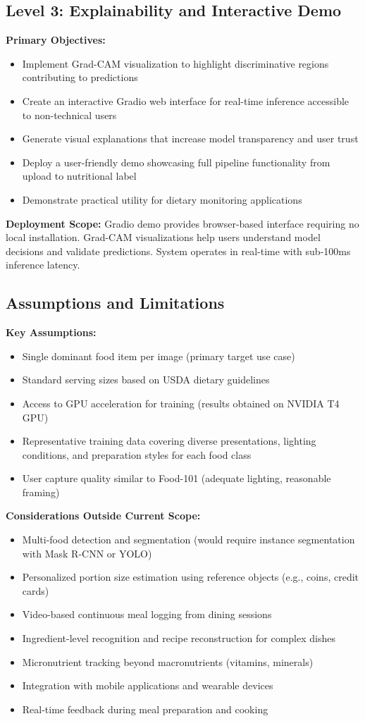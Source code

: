 \documentclass[conference]{IEEEtran}
\begin{document}
\subsection{Level 3: Explainability and Interactive Demo}
\textbf{Primary Objectives:}
\begin{itemize}
    \item Implement Grad-CAM visualization to highlight discriminative regions contributing to predictions
    \item Create an interactive Gradio web interface for real-time inference accessible to non-technical users
    \item Generate visual explanations that increase model transparency and user trust
    \item Deploy a user-friendly demo showcasing full pipeline functionality from upload to nutritional label
    \item Demonstrate practical utility for dietary monitoring applications
\end{itemize}
\textbf{Deployment Scope:} Gradio demo provides browser-based interface requiring no local installation. Grad-CAM visualizations help users understand model decisions and validate predictions. System operates in real-time with sub-100ms inference latency.

\subsection{Assumptions and Limitations}
\textbf{Key Assumptions:}
\begin{itemize}
    \item Single dominant food item per image (primary target use case)
    \item Standard serving sizes based on USDA dietary guidelines
    \item Access to GPU acceleration for training (results obtained on NVIDIA T4 GPU)
    \item Representative training data covering diverse presentations, lighting conditions, and preparation styles for each food class
    \item User capture quality similar to Food-101 (adequate lighting, reasonable framing)
\end{itemize}
\textbf{Considerations Outside Current Scope:}
\begin{itemize}
    \item Multi-food detection and segmentation (would require instance segmentation with Mask R-CNN or YOLO)
    \item Personalized portion size estimation using reference objects (e.g., coins, credit cards)
    \item Video-based continuous meal logging from dining sessions
    \item Ingredient-level recognition and recipe reconstruction for complex dishes
    \item Micronutrient tracking beyond macronutrients (vitamins, minerals)
    \item Integration with mobile applications and wearable devices
    \item Real-time feedback during meal preparation and cooking
\end{itemize}
\end{document}
